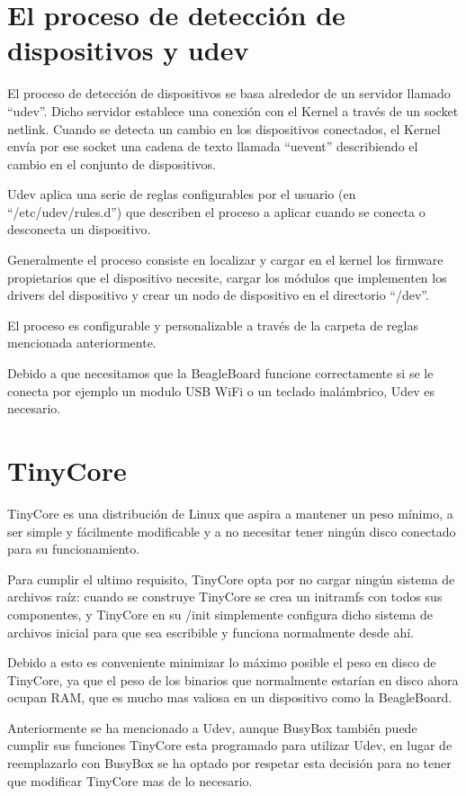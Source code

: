 \documentclass{tfg}
\begin{document}
\section{El proceso de detección de dispositivos y udev}
El proceso de detección de dispositivos se basa alrededor de un servidor llamado ``udev''. Dicho servidor establece una conexión con el Kernel a través de un socket netlink. Cuando se detecta un cambio en los dispositivos conectados, el Kernel envía por ese socket una cadena de texto llamada ``uevent'' describiendo el cambio en el conjunto de dispositivos.

Udev aplica una serie de reglas configurables por el usuario (en ``/etc/udev/rules.d'') que describen el proceso a aplicar cuando se conecta o desconecta un dispositivo.

Generalmente el proceso consiste en localizar y cargar en el kernel los firmware propietarios que el dispositivo necesite, cargar los módulos que implementen los drivers del dispositivo y crear un nodo de dispositivo en el directorio ``/dev''.

El proceso es configurable y personalizable a través de la carpeta de reglas mencionada anteriormente.

Debido a que necesitamos que la BeagleBoard funcione correctamente si se le conecta por ejemplo un modulo USB WiFi o un teclado inalámbrico, Udev es necesario.

\section{TinyCore}
TinyCore es una distribución de Linux que aspira a mantener un peso mínimo, a ser simple y fácilmente modificable y a no necesitar tener ningún disco conectado para su funcionamiento.

Para cumplir el ultimo requisito, TinyCore opta por no cargar ningún sistema de archivos raíz: cuando se construye TinyCore se crea un initramfs con todos sus componentes, y TinyCore en su /init simplemente configura dicho sistema de archivos inicial para que sea escribible y funciona normalmente desde ahí.

Debido a esto es conveniente minimizar lo máximo posible el peso en disco de TinyCore, ya que el peso de los binarios que normalmente estarían en disco ahora ocupan RAM, que es mucho mas valiosa en un dispositivo como la BeagleBoard.

Anteriormente se ha mencionado a Udev, aunque BusyBox también puede cumplir sus funciones TinyCore esta programado para utilizar Udev, en lugar de reemplazarlo con BusyBox se ha optado por respetar esta decisión para no tener que modificar TinyCore mas de lo necesario.
\end{document}
